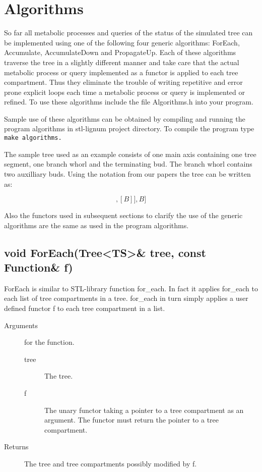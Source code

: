 \section{Algorithms}

So  far  all metabolic processes   and queries  of  the status  of the
simulated  tree can  be  implemented using one  of  the following four
generic     algorithms: ForEach,   Accumulate,  AccumulateDown     and
PropagateUp.  Each of these algorithms traverse the tree in a slightly
different manner and take care   that the actual metabolic process  or
query  implemented as a functor  is applied to  each tree compartment.
Thus they eliminate the trouble  of writing repetitive and error prone
explicit  loops each time a metabolic  process or query is implemented
or refined. To use these algorithms include the file Algorithms.h into
your program.

Sample  use  of these  algorithms can   be  obtained by  compiling and
running  the program algorithms in   stl-lignum project directory.  To
compile the program type \tt make algorithms\rm.


The sample tree   used  as an  example  consists   of  one  main  axis
containing one tree segment, one branch whorl and the terminating bud.
The branch whorl contains two auxilliary buds. Using the notation from
our papers the tree can be written as:

\begin{displaymath}
[TS,[[B],[B]],B]
\end{displaymath}

Also the functors used  in subsequent sections to  clarify the use  of
the generic algorithms are the same as used in the program algorithms.
 
\subsection{void ForEach(Tree<TS>\& tree, const Function\& f)}

ForEach is similar to  STL-library  function  for\_each.  In fact   it
applies  for\_each to  each  list  of  tree  compartments  in a  tree.
for\_each in turn simply applies a user defined functor f to each tree
compartment in a list.

\begin{description}
    \item [Arguments] for the function.
      \begin{description}
        \item [tree] The tree.
        \item [f]  The unary   functor  taking a   pointer to a   tree
      compartment as an argument. The functor  must return the pointer
      to a tree compartment.
     \end{description} 
   \item[Returns] The tree and tree compartments possibly modified by f.
\end{description} 

